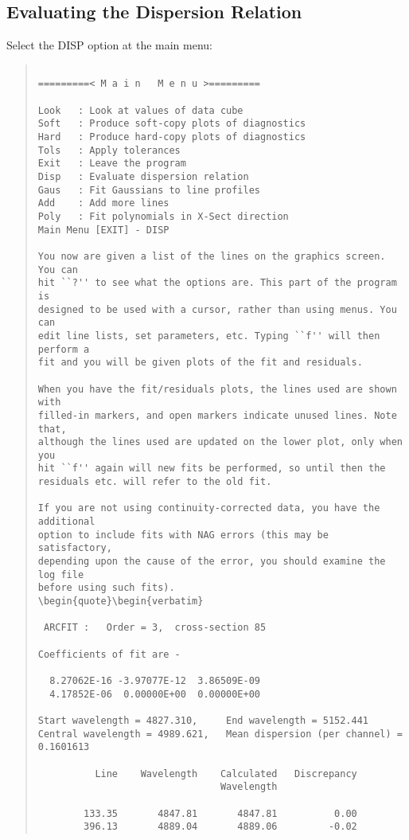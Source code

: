 \subsection{Evaluating the Dispersion Relation}

Select the DISP option at the main menu:
\begin{quote}\begin{verbatim}

=========< M a i n   M e n u >=========

Look   : Look at values of data cube
Soft   : Produce soft-copy plots of diagnostics
Hard   : Produce hard-copy plots of diagnostics
Tols   : Apply tolerances
Exit   : Leave the program
Disp   : Evaluate dispersion relation
Gaus   : Fit Gaussians to line profiles
Add    : Add more lines
Poly   : Fit polynomials in X-Sect direction
Main Menu [EXIT] - DISP

You now are given a list of the lines on the graphics screen. You can
hit ``?'' to see what the options are. This part of the program is
designed to be used with a cursor, rather than using menus. You can
edit line lists, set parameters, etc. Typing ``f'' will then perform a
fit and you will be given plots of the fit and residuals.

When you have the fit/residuals plots, the lines used are shown with
filled-in markers, and open markers indicate unused lines. Note that,
although the lines used are updated on the lower plot, only when you
hit ``f'' again will new fits be performed, so until then the
residuals etc. will refer to the old fit.

If you are not using continuity-corrected data, you have the additional
option to include fits with NAG errors (this may be satisfactory,
depending upon the cause of the error, you should examine the log file
before using such fits).
\begin{quote}\begin{verbatim}

 ARCFIT :   Order = 3,  cross-section 85

Coefficients of fit are -

  8.27062E-16 -3.97077E-12  3.86509E-09
  4.17852E-06  0.00000E+00  0.00000E+00

Start wavelength = 4827.310,     End wavelength = 5152.441
Central wavelength = 4989.621,   Mean dispersion (per channel) = 0.1601613

          Line    Wavelength    Calculated   Discrepancy
                                Wavelength

        133.35       4847.81       4847.81          0.00
        396.13       4889.04       4889.06         -0.02
\end{verbatim}\end{quote}
